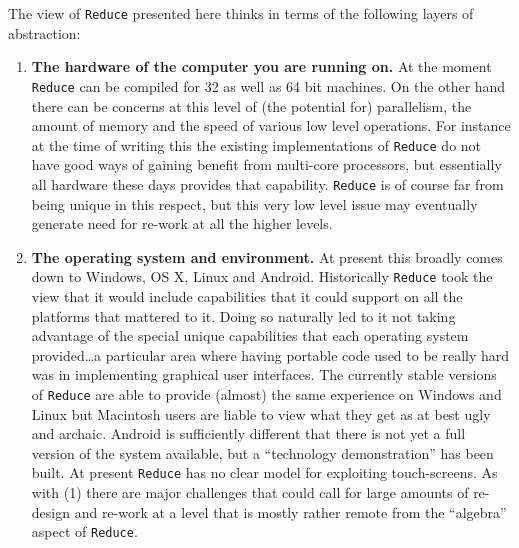 \documentclass[12pt,twoside,openright]{memoir}
\newcommand{\reduce}{\texttt{Reduce}\xspace}
\begin{document}
The view of \reduce presented here thinks in terms of the following layers of
abstraction:
\begin{enumerate}
\item \textbf{The hardware of the computer you are running on.} At the moment
  \reduce can be compiled for 32 as well as 64 bit machines. On the other hand
  there can be concerns at this level of (the potential for) parallelism, the
  amount of memory and the speed of various low level operations. For instance
  at the time of writing this the existing implementations of \reduce do not
  have good ways of gaining benefit from multi-core processors, but essentially
  all hardware these days provides that capability. \reduce is of course far
  from being unique in this respect, but this very low level issue may
  eventually generate need for re-work at all the higher levels.

\item \textbf{The operating system and environment.}  At present this broadly
  comes down to Windows, OS X, Linux and Android.  Historically \reduce took
  the view that it would include capabilities that it could support on all the
  platforms that mattered to it. Doing so naturally led to it not taking
  advantage of the special unique capabilities that each operating system
  provided\dots a particular area where having portable code used to be really
  hard was in implementing graphical user interfaces. The currently stable
  versions of \reduce are able to provide (almost) the same experience on
  Windows and Linux but Macintosh users are liable to view what they get as at
  best ugly and archaic. Android is sufficiently different that there is not
  yet a full version of the system available, but a ``technology
  demonstration'' has been built. At present \reduce has no clear model for
  exploiting touch-screens. As with (1) there are major challenges that could
  call for large amounts of re-design and re-work at a level that is mostly
  rather remote from the ``algebra'' aspect of \reduce.


\end{enumerate}
\end{document}
